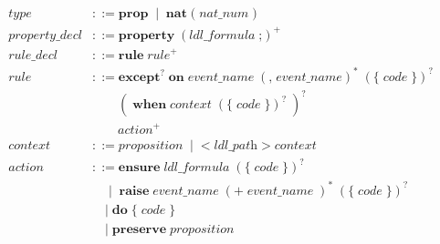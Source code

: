 \documentclass[preview=true]{standalone}
\newcommand{\token}[1]{\textbf{#1}}
\begin{document}
\begin{table}[t]
\begin{align*}
  \textit{type} &::=
    \token{prop}\;
    \mid\; \token{nat}\; \texttt{(}\; \textit{nat\_num}\; \texttt{)}
  \\
  \textit{property\_decl} &::=
  \token{property}\;
  \left(\textit{ldl\_formula}\; \texttt{;}\right)^+
  \\
  \textit{rule\_decl} &::= \token{rule}\;
  \textit{rule}^+
  \\
  \textit{rule} &::=
  \token{except}^?\; \token{on}\; \textit{event\_name}\;
  \left(\texttt{,}\; \textit{event\_name}\right)^\ast\;
  \left( \token{\{}\; \textit{code}\; \token{\}} \right)^?\;
  \\&\qquad
  \left(\;
  \token{when}\; \textit{context}\;
  \left( \token{\{}\; \textit{code}\; \token{\}} \right)^?\;
  \right)^?
  \\&\qquad
  \textit{action}^+
  \\
  \textit{context} &::= \textit{proposition}\;
  \mid\;
  \texttt{<}\; \textit{ldl\_path}\; \texttt{>}\; \textit{context}
  \\
  \textit{action} &::=
  \token{ensure}\; \textit{ldl\_formula}\;
  \left( \token{\{}\; \textit{code}\; \token{\}} \right)^?\;
  \\&\quad
  \mid\;
  \token{raise}\; \textit{event\_name}\; \left(\texttt{+}\; \textit{event\_name}\; \right)^\ast\;
  \left( \token{\{}\; \textit{code}\; \token{\}} \right)^?\;
  \\&\quad
  \mid\;
  \token{do}\;
  \token{\{}\; \textit{code}\; \token{\}}\;
  \\&\quad
  \mid\;
  \token{preserve}\; \textit{proposition}
\end{align*}
\end{table}
\smallskip
\end{document}
